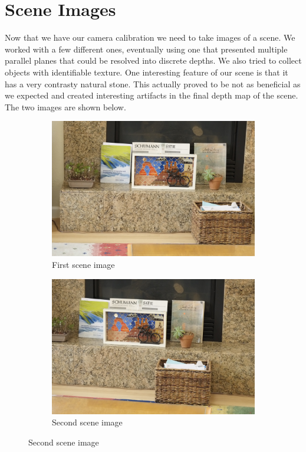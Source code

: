 \documentclass[a4paper]{article}
\begin{document}
\section{Scene Images}
Now that we have our camera calibration we need to take images of a scene.  We worked with a few different ones, eventually using one that presented multiple parallel planes that could be resolved into discrete depths.  We also tried to collect objects with identifiable texture.  One interesting feature of our scene is that it has a very contrasty natural stone. This actually proved to be not as beneficial as we expected and created interesting artifacts in the final depth map of the scene.  The two images are shown below.

\begin{figure}
    \centering
    \begin{subfigure}[b]{0.45\textwidth}
        \includegraphics[width=\textwidth]{../Scene/_DSF1768.JPG}
        \caption{First scene image}
        \label{fig:sn1}
    \end{subfigure}
    \begin{subfigure}[b]{0.45\textwidth}
        \includegraphics[width=\textwidth]{../Scene/_DSF1769.JPG}
        \caption{Second scene image}
        \label{fig:sn2}
    \end{subfigure}
\end{figure}
\end{document}
